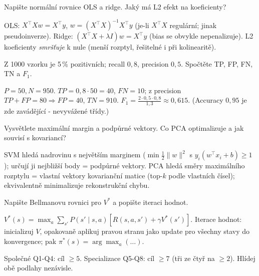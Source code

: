 \begin{zadani}Napište normální rovnice OLS a ridge. Jaký má L2 efekt na koeficienty?\end{zadani}
\begin{reseni}OLS: $X^{\!\top}Xw=X^{\!\top}y$, $w=(X^{\!\top}X)^{-1}X^{\!\top}y$ (je-li $X^{\!\top}X$ regulární; jinak pseudoinverze). Ridge: $(X^{\!\top}X+\lambda I)w=X^{\!\top}y$ (bias se obvykle nepenalizuje). L2 koeficienty \emph{smršťuje} k nule (menší rozptyl, řešitelné i při kolinearitě).\end{reseni}

\begin{zadani}Z 1000 vzorku je 5\,\% pozitivních; recall $0{,}8$, precision $0{,}5$. Spočtěte TP, FP, FN, TN a $F_1$.\end{zadani}
\begin{reseni}$P=50,N=950$. $TP=0{,}8\cdot50=40$, $FN=10$; z precision $TP+FP=80\Rightarrow FP=40$, $TN=910$. $F_1=\tfrac{2\cdot0{,}5\cdot0{,}8}{1{,}3}\approx0{,}615$. (Accuracy $0{,}95$ je zde zavádějící - nevyvážené třídy.)\end{reseni}

\begin{zadani}Vysvětlete maximální margin a podpůrné vektory. Co PCA optimalizuje a jak souvisí s kovariancí?\end{zadani}
\begin{reseni}SVM hledá nadrovinu s největším marginem ($\min\tfrac12\|w\|^2$ s $y_i(w^{\!\top}x_i+b)\ge1$); určují ji nejbližší body = podpůrné vektory. PCA hledá směry maximálního rozptylu = vlastní vektory kovarianční matice (top-$k$ podle vlastních čísel); ekvivalentně minimalizuje rekonstrukční chybu.\end{reseni}

\begin{zadani}Napište Bellmanovu rovnici pro $V^*$ a popište iteraci hodnot.\end{zadani}
\begin{reseni}$V^*(s)=\max_a\sum_{s'}P(s'\mid s,a)[R(s,a,s')+\gamma V^*(s')]$. Iterace hodnot: inicializuj $V$, opakovaně aplikuj pravou stranu jako update pro všechny stavy do konvergence; pak $\pi^*(s)=\arg\max_a(\dots)$.\end{reseni}

\begin{infobox}[title={Bodování (orientačně)}]
\footnotesize Společné Q1-Q4: cíl $\ge5$. Specializace Q5-Q8: cíl $\ge7$ (tři ze čtyř na $\ge2$). Hlídej obě podlahy nezávisle.
\end{infobox}
